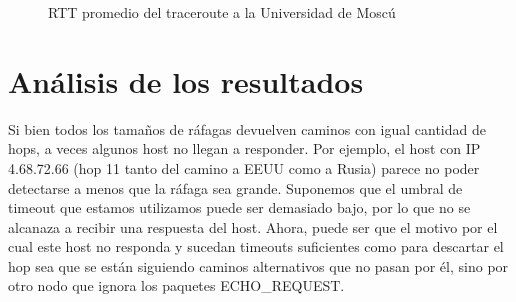 \begin{figure}[H]
  \centering
  \caption{RTT promedio del traceroute a la Universidad de Moscú}
  \label{rusiaTTL}
\end{figure}


\section{Análisis de los resultados}


Si bien todos los tamaños de ráfagas devuelven caminos con igual cantidad de hops, a veces algunos host no llegan a responder. Por ejemplo, el host con IP 4.68.72.66 (hop 11 tanto del camino a EEUU como a Rusia) parece no poder detectarse a menos que la ráfaga sea grande. Suponemos que el umbral de timeout que estamos utilizamos puede ser demasiado bajo, por lo que no se alcanaza a recibir una respuesta del host. Ahora, puede ser que el motivo por el cual este host no responda y sucedan timeouts suficientes como para descartar el hop sea que se están siguiendo caminos alternativos que no pasan por él, sino por otro nodo que ignora los paquetes ECHO\_REQUEST. 

